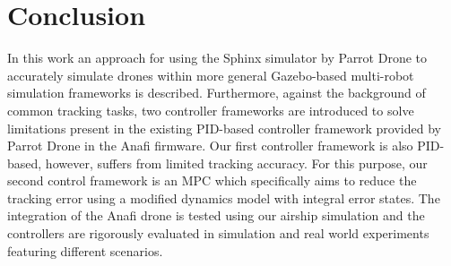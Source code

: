 \section{Conclusion} \label{sec:conclusion}
In this work an approach for using the Sphinx simulator by Parrot Drone to accurately simulate drones within more general Gazebo-based multi-robot simulation  frameworks is described. Furthermore, against the background of common tracking tasks, two controller frameworks are introduced to solve limitations present in the existing  PID-based controller framework provided by Parrot Drone in the Anafi firmware. Our first controller framework is also PID-based, however, suffers from limited tracking accuracy. For this purpose, our second control framework is an MPC which specifically aims to reduce the tracking error using a modified dynamics model with integral error states. The integration of the Anafi drone is tested using our airship simulation \cite{price2022} and the controllers are rigorously evaluated in simulation and real world experiments featuring different scenarios. 